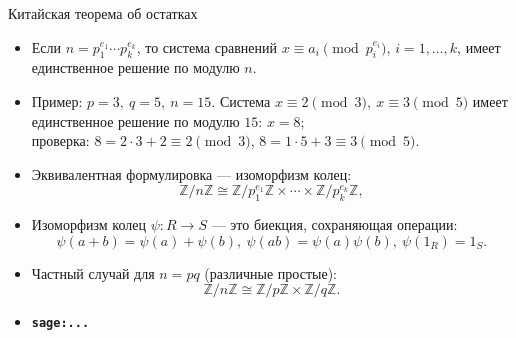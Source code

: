 \documentclass[serif, aspectratio=169]{beamer}
\newcommand{\sagemark}{%
  \textcolor{green!40!black}{\textbf{\texttt{sage:...}}}%
}
\begin{document}
\begin{frame}{Китайская теорема об остатках}
    \begin{itemize}
        \item Если $n = p_1^{e_1}\cdots p_k^{e_k}$, то система сравнений $x\equiv a_i \pmod{p_i^{e_i}}$, $i=1,\dots,k$, имеет единственное решение по модулю $n$.
        \item Пример: $p=3,\ q=5,\ n=15$. Система $x\equiv2\pmod3,\ x\equiv3\pmod5$ имеет единственное решение по модулю $15$: $x=8$;\\ проверка: $8=2\cdot3+2\equiv2\pmod3$, $8=1\cdot5+3\equiv3\pmod5$.
        \item Эквивалентная формулировка --- изоморфизм колец: 
        \[\mathbb{Z}/n\mathbb{Z} \cong \mathbb{Z}/p_1^{e_1}\mathbb{Z}\times\cdots\times\mathbb{Z}/p_k^{e_k}\mathbb{Z},\]
        \item Изоморфизм колец $\psi: R\to S$ --- это биекция, сохраняющая операции: 
        \[\psi(a+b)=\psi(a)+\psi(b),\ \psi(ab)=\psi(a)\psi(b),\ \psi(1_R)=1_S.\]
        \item Частный случай для $n=pq$ (различные простые): 
        \[\mathbb{Z}/n\mathbb{Z}\cong\mathbb{Z}/p\mathbb{Z}\times\mathbb{Z}/q\mathbb{Z}.\]
        \item \sagemark
    \end{itemize}
\end{frame}
\end{document}
